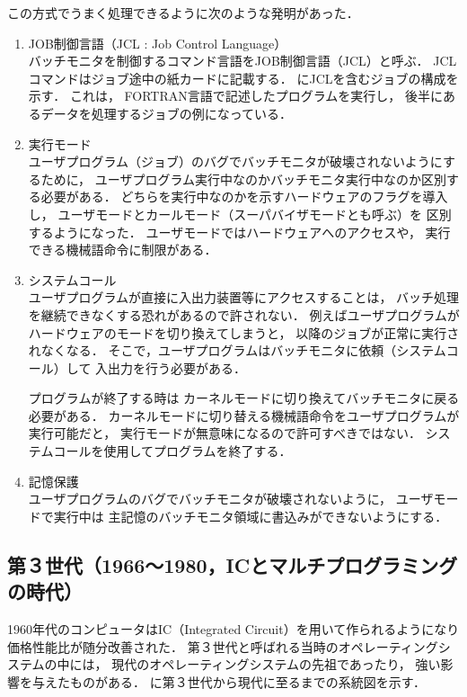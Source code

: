 

この方式でうまく処理できるように次のような発明があった．

\begin{enumerate}
\item JOB制御言語（JCL : Job Control Language） \\
バッチモニタを制御するコマンド言語をJOB制御言語（JCL）と呼ぶ．
JCLコマンドはジョブ途中の紙カードに記載する．
にJCLを含むジョブの構成を示す．
これは，
FORTRAN言語で記述したプログラムを実行し，
後半にあるデータを処理するジョブの例になっている．


\item 実行モード \\
ユーザプログラム（ジョブ）のバグでバッチモニタが破壊されないようにするために，
ユーザプログラム実行中なのかバッチモニタ実行中なのか区別する必要がある．
どちらを実行中なのかを示すハードウェアのフラグを導入し，
ユーザモードとカールモード（スーパバイザモードとも呼ぶ）を
区別するようになった．
ユーザモードではハードウェアへのアクセスや，
実行できる機械語命令に制限がある．

\item システムコール \\
ユーザプログラムが直接に入出力装置等にアクセスすることは，
バッチ処理を継続できなくする恐れがあるので許されない．
例えばユーザプログラムがハードウェアのモードを切り換えてしまうと，
以降のジョブが正常に実行されなくなる．
そこで，ユーザプログラムはバッチモニタに依頼（システムコール）して
入出力を行う必要がある．

プログラムが終了する時は
カーネルモードに切り換えてバッチモニタに戻る必要がある．
カーネルモードに切り替える機械語命令をユーザプログラムが実行可能だと，
実行モードが無意味になるので許可すべきではない．
システムコールを使用してプログラムを終了する．

\item 記憶保護 \\
ユーザプログラムのバグでバッチモニタが破壊されないように，
ユーザモードで実行中は
主記憶のバッチモニタ領域に書込みができないようにする．
\end{enumerate}

\subsection{第３世代（1966〜1980，ICとマルチプログラミングの時代）}
1960年代のコンピュータはIC（Integrated Circuit）を用いて作られるようになり
価格性能比が随分改善された．
第３世代と呼ばれる当時のオペレーティングシステムの中には，
現代のオペレーティングシステムの先祖であったり，
強い影響を与えたものがある．
に第３世代から現代に至るまでの系統図を示す．


